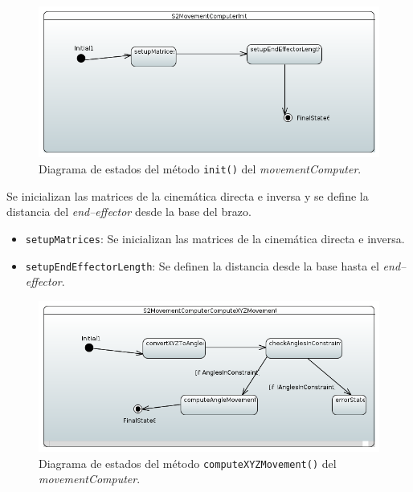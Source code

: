 \begin{figure}[H]
    \centering
    \includegraphics[width=1\linewidth]{pictures/S2MovementComputerInit.PNG}
    \caption{Diagrama de estados del método \texttt{init()} del \textit{movementComputer}.}
    \label{fig:fun_init_movement_computer}
\end{figure}

Se inicializan las matrices de la cinemática directa e inversa y se define la distancia del \textit{end--effector} desde la base del brazo.

\begin{itemize}
    \item \texttt{setupMatrices}: Se inicializan las matrices de la cinemática directa e inversa.
    \item \texttt{setupEndEffectorLength}: Se definen la distancia desde la base hasta el \textit{end--effector}.
\end{itemize}

\begin{figure}[H]
    \centering
    \includegraphics[width=1\linewidth]{pictures/S2MovementComputerComputeXYZMovement.PNG}
    \caption{Diagrama de estados del método \texttt{computeXYZMovement()} del \textit{movementComputer}.}
    \label{fig:fun_compute_xyz_movement_movement_computer}
\end{figure}

